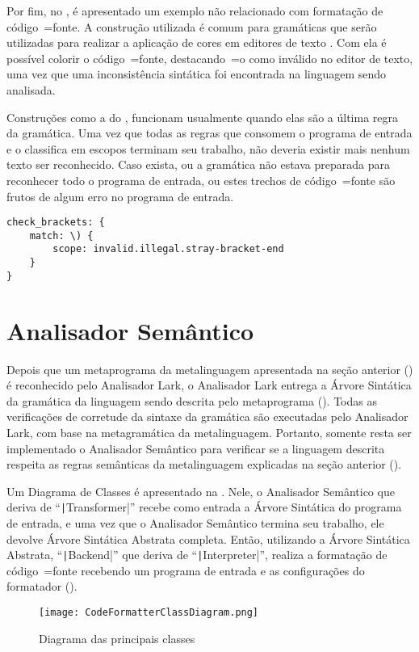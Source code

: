 Por fim,
no ,
é apresentado um exemplo não relacionado com formatação de código~=fonte.
A construção utilizada é comum para gramáticas que serão utilizadas para realizar a aplicação de cores em editores de texto \cite{vsCodeSyntaxHighlighthing}.
Com ela é possível colorir o código~=fonte,
destacando~=o como inválido no editor de texto,
uma vez que uma inconsistência sintática foi encontrada na linguagem sendo analisada.

Construções como a do ,
funcionam usualmente quando elas são a última regra da gramática.
Uma vez que todas as regras que consomem o programa de entrada e
o classifica em escopos terminam seu trabalho,
não deveria existir mais nenhum texto ser reconhecido.
Caso exista,
ou a gramática não estava preparada para reconhecer todo o programa de entrada,
ou estes trechos de código~=fonte são frutos de algum erro no programa de entrada.
\begin{lstlisting}[caption={Exemplo de Gramática, Reconhecimento de Erros},label={code:exemploDeGramaticaPawn5},style=yaml_style]
check_brackets: {
    match: \) {
        scope: invalid.illegal.stray-bracket-end
    }
}
\end{lstlisting}


\section{Analisador Semântico}
\label{section:AnalisadorSemantico}

Depois que um metaprograma da metalinguagem apresentada na seção anterior () é reconhecido pelo Analisador Lark,
o Analisador Lark entrega a Árvore Sintática da gramática da linguagem sendo descrita pelo metaprograma ().
Todas as verificações de corretude da sintaxe da gramática são executadas pelo Analisador Lark,
com base na metagramática da metalinguagem.
Portanto,
somente resta ser implementado o Analisador Semântico para verificar se a linguagem descrita respeita as regras semânticas da metalinguagem explicadas na seção anterior ().

Um Diagrama de Classes é apresentado na .
Nele,
o Analisador Semântico que deriva de ``\texttt|Transformer|'' recebe como entrada a Árvore Sintática do programa de entrada,
e uma vez que o Analisador Semântico termina seu trabalho,
ele devolve Árvore Sintática Abstrata completa.
Então,
utilizando a Árvore Sintática Abstrata,
``\texttt|Backend|'' que deriva de ``\texttt|Interpreter|'',
realiza a formatação de código~=fonte recebendo um programa de entrada e
as configurações do formatador ().
\begin{figure}[!htb]
\caption{Diagrama das principais classes}
\label{figure:CodeFormatterClassDiagram}
\centering
\texttt{[image: CodeFormatterClassDiagram.png]}
\end{figure}

